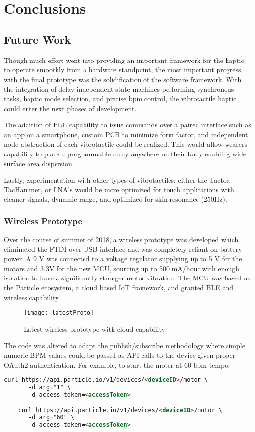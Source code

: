 
\chapter{Conclusions} \label{chapConclusions}


\section{Future Work}
Though much effort went into providing an important framework for the haptic to operate smoothly from a hardware standpoint, the most important progress with the final prototype was the solidification of the software framework. With the integration of delay independent state-machines performing synchronous tasks, haptic mode selection, and precise bpm control, the vibrotactile haptic could enter the next phases of development. 

The addition of BLE capability to issue commands over a paired interface such as an app on a smartphone, custom PCB to minimize form factor, and independent node abstraction of each vibrotactile could be realized. This would allow wearers capability to place a programmable array anywhere on their body enabling wide surface area dispersion. 

Lastly, experimentation with other types of vibrotactiles; either the Tactor, TacHammer, or LNA's would be more optimized for touch applications with cleaner signals, dynamic range, and optimized for skin resonance (250Hz).

\subsection{Wireless Prototype}\label{wirelessHP}
Over the course of summer of 2018, a wireless prototype was developed which eliminated the FTDI over USB interface and was completely reliant on battery power. A 9 V was connected to a voltage regulator supplying up to 5 V for the motors and 3.3V for the new MCU, sourcing up to 500 mA/hour with enough isolation to have a significantly stronger motor vibration. The MCU was based on the Particle ecosystem, a cloud based IoT framework, and granted BLE and wireless capability. 
\begin{figure}[H]
    \centering
    \texttt{[image: latestProto]}
    \caption{Latest wireless prototype with cloud capability}
\end{figure}
The code was altered to adapt the publish/subscribe methodology where simple numeric BPM values could be passed as API calls to the device given proper OAuth2 authentication. For example, to start the motor at 60 bpm tempo:
\begin{lstlisting}[language=html]
    curl https://api.particle.io/v1/devices/<deviceID>/motor \
       -d arg="1" \
       -d access_token=<accessToken>

    curl https://api.particle.io/v1/devices/<deviceID>/motor \
       -d arg="60" \
       -d access_token=<accessToken>
\end{lstlisting}

